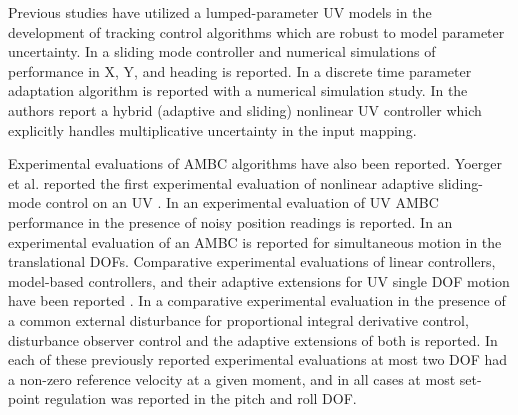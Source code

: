 Previous studies have utilized a lumped-parameter \ac{UV} models in
the development of tracking control algorithms which are robust to
model parameter uncertainty.
%
In \cite{yoerger&slotine.JOE85} a sliding mode controller and
numerical simulations of performance in X, Y, and heading is reported.
%
In \cite{Yuh1990} a discrete time parameter adaptation algorithm is
reported with a numerical simulation study.  
%
In \cite{Fossen1991} the authors report a hybrid (adaptive and
sliding) nonlinear \ac{UV} controller which explicitly handles
multiplicative uncertainty in the input mapping.


Experimental evaluations of \ac{AMBC} algorithms have also been
reported.
%
Yoerger et al. reported the first experimental evaluation of nonlinear
adaptive sliding-mode control on an \ac{UV} \cite{yoerger.icra91}.
%
In \cite{yuhICRA1999} an experimental evaluation of \ac{UV} \ac{AMBC}
performance in the presence of noisy position readings is reported.
%
In \cite{antonelli&sarkar.cst2001} an experimental evaluation of an
\ac{AMBC} is reported for simultaneous motion in the translational
\acp{DOF}.
%
Comparative experimental evaluations of linear controllers,
model-based controllers, and their adaptive extensions for \ac{UV} single
\ac{DOF} motion have been reported \cite{smallwood2004JOE, maalouf2013pd}.
%
In \cite{zhao2005experimental} a comparative experimental evaluation
in the presence of a common external disturbance for proportional
integral derivative control, disturbance observer control and the
adaptive extensions of both is reported.
%
%
In each of these previously reported experimental evaluations at most
two \ac{DOF} had a non-zero reference velocity at a given moment, and
in all cases at most set-point regulation was reported in the pitch and
roll \ac{DOF}.
